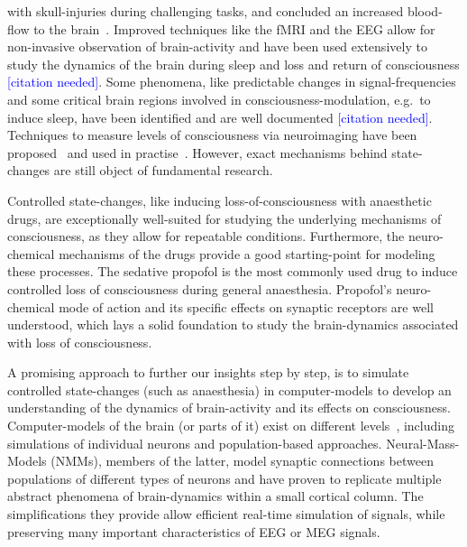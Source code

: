 with skull-injuries during challenging tasks,
and concluded an increased blood-flow to the brain~\cite{mosso_ueber_1881}.
Improved techniques like the fMRI and the EEG allow for non-invasive observation of brain-activity and have been
used extensively to study the dynamics of the brain during sleep and loss and return of consciousness
\textcolor{blue}{[citation needed]}.
Some phenomena, like predictable changes in signal-frequencies and some critical brain regions involved in
consciousness-modulation, e.g.\ to induce sleep, have been identified and are well documented
\textcolor{blue}{[citation
needed]}.
Techniques to measure levels of consciousness via neuroimaging have been proposed~\cite{sigl_introduction_1994,
    casali_theoretically_2013} and used in practise~\cite{mathur_bispectral_2022}.
However, exact mechanisms behind state-changes are still object of fundamental research.

Controlled state-changes, like inducing loss-of-consciousness with anaesthetic drugs,
are exceptionally well-suited for studying the underlying mechanisms of consciousness,
as they allow for repeatable conditions.
Furthermore, the neuro-chemical mechanisms of the drugs provide a good starting-point for modeling these processes.
The sedative propofol is the most commonly used drug to induce controlled loss of consciousness
during general anaesthesia.
Propofol's neuro-chemical mode of action and its specific effects on synaptic receptors are well understood,
which lays a solid foundation to study the brain-dynamics associated with loss of consciousness.


A promising approach to further our insights step by step, is to simulate controlled state-changes
(such as anaesthesia) in computer-models to develop an understanding of the dynamics of brain-activity and its
effects on consciousness. %
Computer-models of the brain (or parts of it) exist on different levels~\cite{panahi_generative_2021},
including simulations of individual neurons and population-based approaches.
Neural-Mass-Models (NMMs), members of the latter, model synaptic connections between populations of different types
of neurons and have proven to replicate multiple abstract phenomena of brain-dynamics\cite{bojak_neural_2014,
    knösche_jansen-rit_2014} within a small cortical
column.
The simplifications they provide allow efficient real-time simulation of signals,
while preserving many important characteristics of EEG or MEG signals.

